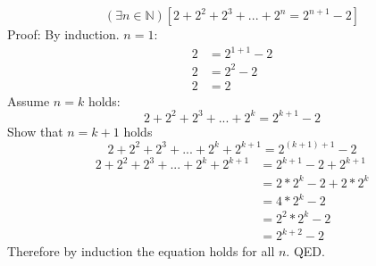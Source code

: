 \documentclass{article}
\begin{document}
$$(\exists n \in \mathbb{N})[2+2^{2}+2^{3}+...+2^{n}=2^{n+1}-2]$$
Proof: By induction.
\newline
$n=1$:
\begin{align*}
2&=2^{1+1}-2\\
2&=2^{2}-2\\
2&=2
\end{align*}
\newline
Assume $n=k$ holds:
$$2+2^{2}+2^{3}+...+2^{k}=2^{k+1}-2$$
Show that $n=k+1$ holds
\begin{equation*}
2+2^{2}+2^{3}+...+2^{k}+2^{k+1}=2^{(k+1)+1}-2 \tag*{(By induction)}
\end{equation*}
\begin{align*}
2+2^{2}+2^{3}+...+2^{k}+2^{k+1}&=2^{k+1}-2+2^{k+1}\\
&=2*2^{k}-2+2*2^{k}\\
&=4*2^{k}-2\\
&=2^2*2^{k}-2\\
&=2^{k+2}-2
\end{align*}
Therefore by induction the equation holds for all $n$.
\newline
QED.
\end{document}
